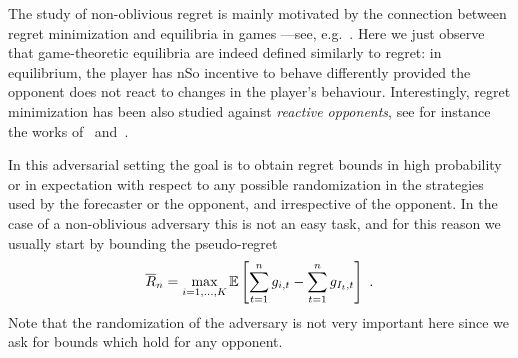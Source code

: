 The study of non-oblivious regret is mainly motivated by the connection between regret minimization and equilibria in games ---see, e.g.~\cite[Section~9]{ACFS03}. Here we just observe that game-theoretic equilibria are indeed defined similarly to regret: in equilibrium, the player has nSo incentive to behave differently provided the opponent does not react to changes in the player's behaviour. Interestingly, regret minimization has been also studied against \textsl{reactive opponents}, see for instance the works of~\cite{farias2006combining} and~\cite{arora2012online}.
%
\begin{center}
\end{center}
%
In this adversarial setting the goal is to obtain regret bounds in high probability or in expectation with respect to any possible randomization in the strategies used by the forecaster or the opponent, and irrespective of the opponent. In the case of a non-oblivious adversary this is not an easy task, and for this reason we usually start by bounding the pseudo-regret
%
\[
\overline{R}_n = \max_{i=1,\dots,K} \mathbb{E}\left[\sum_{t=1}^n g_{i,t} - \sum_{t=1}^n g_{I_t,t}\right]~.
\]
%
Note that the randomization of the adversary is not very important here since we ask for bounds which hold for any opponent.
